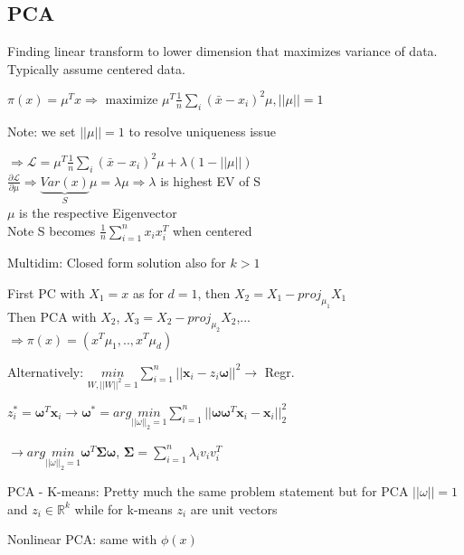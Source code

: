 \subsection{PCA}

Finding linear transform to lower dimension that maximizes variance of data. Typically assume centered data.

$\pi(x) = \mu^Tx \Rightarrow \text{ maximize } \mu^T\frac{1}{n}\sum_i(\bar{x} -x_i)^2\mu, ||\mu|| = 1$

Note: we set $||\mu|| = 1$ to resolve uniqueness issue
\begin{center}
    $\Rightarrow \mathcal{L} = \mu^T\frac{1}{n}\sum_i(\bar{x} -x_i)^2\mu + \lambda(1-||\mu||)$\\
    $\frac{\partial \mathcal{L}}{\partial \mu} \Rightarrow \underbrace{Var(x)}_{S}\mu = \lambda \mu \Rightarrow \lambda$ is highest EV of S\\
    $\mu$ is the respective Eigenvector\\
    Note S becomes $\frac{1}{n}\sum_{i=1}^nx_ix_i^T$ when centered
\end{center}
Multidim: Closed form solution also for $k> 1$
\begin{center}
    First PC with $X_1 = x$ as for $d = 1$, then $X_2 = X_1-proj_{\mu_1}X_1$\\
    Then PCA with $X_2$, $X_3 = X_2 - proj_{\mu_2}X_2$,... \\$\Rightarrow \pi(x) = (x^T\mu_1,..,x^T\mu_d)$
\end{center}

Alternatively: $\underset{W, ||W||^2 = 1}{min}\sum_{i=1}^n||\boldsymbol{x}_i - z_i\boldsymbol{\omega}||^2 \rightarrow$ Regr.

$z_i^* = \boldsymbol{\omega}^T\boldsymbol{x}_i \rightarrow \boldsymbol{\omega}^* = arg \underset{||\omega||_2 = 1}{min}\sum_{i=1}^n||\boldsymbol{\omega}\boldsymbol{\omega}^T\boldsymbol{x}_i - \boldsymbol{x}_i||^2_2$

$\rightarrow arg \underset{||\omega||_2 = 1}{min}\boldsymbol{\omega}^T\boldsymbol{\Sigma}\boldsymbol{\omega}$, $\boldsymbol{\Sigma} = \sum_{i=1}^n \lambda_iv_iv_i^T$

PCA - K-means: Pretty much the same problem statement but for PCA $||\omega|| = 1$ and $z_i \in \mathbb{R}^k$ while for k-means $z_i$ are unit vectors

Nonlinear PCA: same with $\phi(x)$

